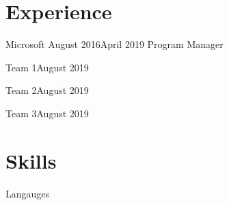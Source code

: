 \documentclass[]{../resume}
\author{Caleb Thorsteinson}
\begin{document}

\section{Experience}

\begin{employer}{Microsoft} {August 2016}{April 2019} {Program Manager}
  \begin{team}{Team 1}{August 2019}
    \lipsum[1]
  \end{team}
  \begin{team}{Team 2}{August 2019}
    \lipsum[2]
  \end{team}
  \begin{team}{Team 3}{August 2019}
    \lipsum[3]
  \end{team}
\end{employer}

\newcolumn


\section{Skills}

\begin{skilltable}{Langauges}
\end{skilltable}
    
\end{document}

